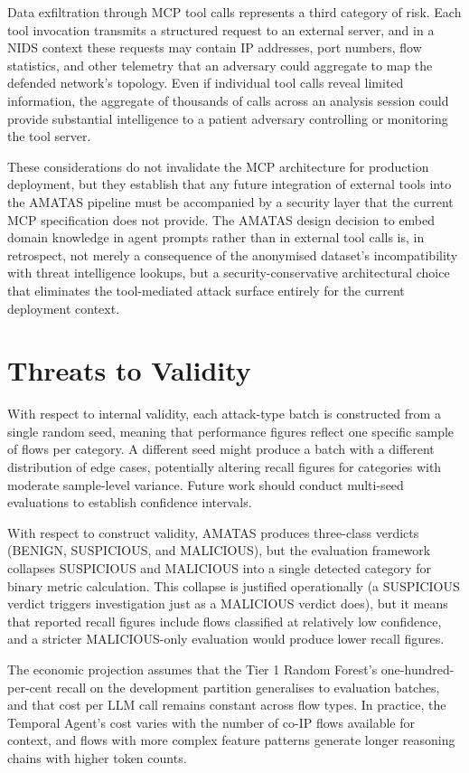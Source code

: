 Data exfiltration through MCP tool calls represents a third category of risk. Each tool invocation transmits a structured request to an external server, and in a NIDS context these requests may contain IP addresses, port numbers, flow statistics, and other telemetry that an adversary could aggregate to map the defended network's topology. Even if individual tool calls reveal limited information, the aggregate of thousands of calls across an analysis session could provide substantial intelligence to a patient adversary controlling or monitoring the tool server.

These considerations do not invalidate the MCP architecture for production deployment, but they establish that any future integration of external tools into the AMATAS pipeline must be accompanied by a security layer that the current MCP specification does not provide. The AMATAS design decision to embed domain knowledge in agent prompts rather than in external tool calls is, in retrospect, not merely a consequence of the anonymised dataset's incompatibility with threat intelligence lookups, but a security-conservative architectural choice that eliminates the tool-mediated attack surface entirely for the current deployment context.

\section{Threats to Validity}

With respect to internal validity, each attack-type batch is constructed from a single random seed, meaning that performance figures reflect one specific sample of flows per category. A different seed might produce a batch with a different distribution of edge cases, potentially altering recall figures for categories with moderate sample-level variance. Future work should conduct multi-seed evaluations to establish confidence intervals.

With respect to construct validity, AMATAS produces three-class verdicts (BENIGN, SUSPICIOUS, and MALICIOUS), but the evaluation framework collapses SUSPICIOUS and MALICIOUS into a single detected category for binary metric calculation. This collapse is justified operationally (a SUSPICIOUS verdict triggers investigation just as a MALICIOUS verdict does), but it means that reported recall figures include flows classified at relatively low confidence, and a stricter MALICIOUS-only evaluation would produce lower recall figures.

The economic projection assumes that the Tier 1 Random Forest's one-hundred-per-cent recall on the development partition generalises to evaluation batches, and that cost per LLM call remains constant across flow types. In practice, the Temporal Agent's cost varies with the number of co-IP flows available for context, and flows with more complex feature patterns generate longer reasoning chains with higher token counts.
